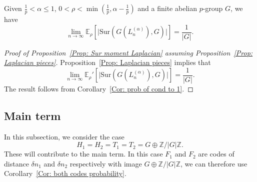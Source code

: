 \documentclass[12pt]{amsart}
\theoremstyle{definition}
\newcommand{\Lna}{L_{n}^{(\alpha)}}
\newcommand{\Erho}{\E_{\rho}}
\newcommand{\Erhop}{\E_{\rho}'}
\newcommand{\ZG}{\Z/\abs{G}\Z}
\newcommand{\abs}[1]{\vert#1\vert}
\newcommand{\E}{\mathbb{E}}
\newcommand{\Z}{\mathbb{Z}}
\newcommand{\Sur}{\text{Sur}}
\newenvironment{customprop}[1]
  {\renewcommand\theinnercustomprop{#1}\innercustomprop}
  {\endinnercustomprop}
\begin{document}
\begin{customprop}{\ref{Prop: Sur moment Laplacian}}
Given $\frac{1}{p}<\alpha\leq 1$, $0<\rho<\min(\frac{1}{p},\alpha-\frac{1}{p})$ and a finite abelian $p$-group $G$, we have
\[
\lim_{n\to\infty} \Erho[\abs{\Sur(G(\Lna),G)}] 
=\frac{1}{\abs{G}}.
\]
\end{customprop}
\begin{proof}[Proof of Proposition~\ref{Prop: Sur moment Laplacian} assuming Proposition~\ref{Prop: Laplacian pieces}]
Proposition~\ref{Prop: Laplacian pieces} implies that
\[
\lim_{n\to\infty}
\Erhop[\abs{\Sur(G(\Lna),G)}] =\frac{1}{\abs{G}}.
\]
The result follows from Corollary~\ref{Cor: prob of cond to 1}.
\end{proof}



\subsection{Main term}
In this subsection, we consider the case
\[
H_1=H_2=T_1=T_2=G \oplus\ZG.
\]
These will contribute to the main term. In this case $F_1$ and $F_2$ are codes of distance $\delta n_1$ and $\delta n_2$ respectively with image $G\oplus\ZG$, we can therefore use Corollary~\ref{Cor: both codes probability}.
\end{document}
